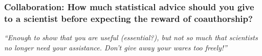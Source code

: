 \documentclass[12pt]{beamer}
\newcommand\ans[1]{{\it ``#1''}}
\newcommand\gap{\vspace{5mm}}
\begin{document}
\begin{frame} %
  \frametitle{Collaboration: How much statistical advice should you give to a scientist before expecting the reward of coauthorship?}

\ans{Enough to show that you are useful (essential?),  but not so much that scientists no longer need your assistance.  Don’t give away your wares too freely!}
  

\gap



\end{frame}
\end{document}
